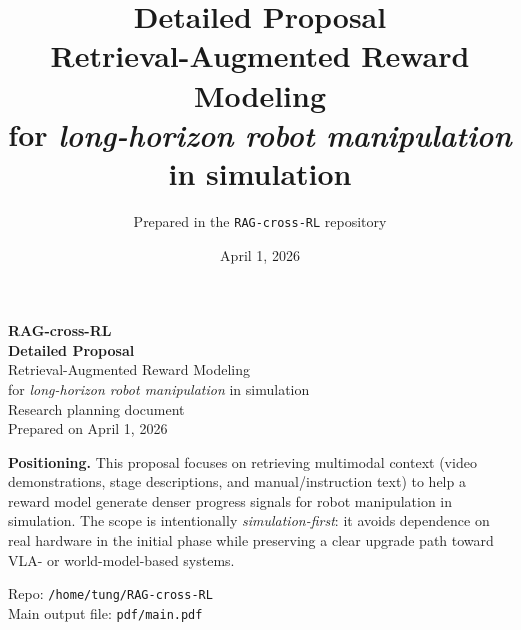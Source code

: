\documentclass[11pt,a4paper]{article}
\title{\textbf{Detailed Proposal}\\[0.4em]
Retrieval-Augmented Reward Modeling\\
for \textit{long-horizon robot manipulation} in simulation}
\author{Prepared in the \texttt{RAG-cross-RL} repository}
\date{April 1, 2026}
\begin{document}
\hypersetup{pageanchor=false}
\begin{titlepage}
  \centering
  {\Large \textbf{RAG-cross-RL}}\\[1.2cm]
  {\huge \textbf{Detailed Proposal}}\\[0.5cm]
  {\LARGE Retrieval-Augmented Reward Modeling\\
  for \textit{long-horizon robot manipulation} in simulation}\\[1.4cm]
  {\large Research planning document}\\[0.3cm]
  {\large Prepared on April 1, 2026}\\[1.6cm]

  \begin{minipage}{0.88\textwidth}
    \small
    \textbf{Positioning.} This proposal focuses on retrieving multimodal context
    (video demonstrations, stage descriptions, and manual/instruction text)
    to help a reward model generate denser progress signals for robot manipulation in simulation.
    The scope is intentionally \textit{simulation-first}: it avoids dependence on real hardware
    in the initial phase while preserving a clear upgrade path toward VLA- or world-model-based systems.
  \end{minipage}

  \vfill
  {\large Repo: \texttt{/home/tung/RAG-cross-RL}}\\[0.3cm]
  {\large Main output file: \texttt{pdf/main.pdf}}
\end{titlepage}
\clearpage
\hypersetup{pageanchor=true}

\tableofcontents
\newpage








\end{document}
